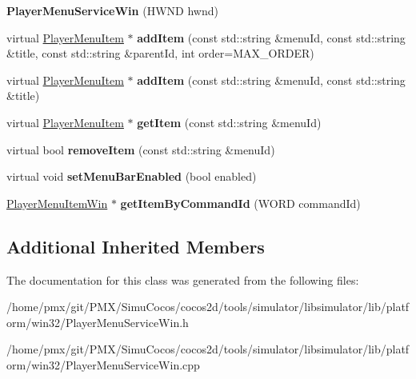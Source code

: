 \begin{DoxyCompactItemize}
{\bfseries Player\+Menu\+Service\+Win} (H\+W\+ND hwnd)
\item 
\mbox{\label{classPlayerMenuServiceWin_aabfcfea20278c36b7c9c483c688c1677}} 
virtual \hyperlink{classPlayerMenuItem}{Player\+Menu\+Item} $\ast$ {\bfseries add\+Item} (const std\+::string \&menu\+Id, const std\+::string \&title, const std\+::string \&parent\+Id, int order=M\+A\+X\+\_\+\+O\+R\+D\+ER)
\item 
\mbox{\label{classPlayerMenuServiceWin_a9c8ff07e00025d5bf4ee51d768a443d3}} 
virtual \hyperlink{classPlayerMenuItem}{Player\+Menu\+Item} $\ast$ {\bfseries add\+Item} (const std\+::string \&menu\+Id, const std\+::string \&title)
\item 
\mbox{\label{classPlayerMenuServiceWin_aa9096aef2d35b84e9774f11fa275e130}} 
virtual \hyperlink{classPlayerMenuItem}{Player\+Menu\+Item} $\ast$ {\bfseries get\+Item} (const std\+::string \&menu\+Id)
\item 
\mbox{\label{classPlayerMenuServiceWin_a80ea8fe18ea241f033449dd279ae6035}} 
virtual bool {\bfseries remove\+Item} (const std\+::string \&menu\+Id)
\item 
\mbox{\label{classPlayerMenuServiceWin_ad9a72063cccd1b527b9f1f59c0a75100}} 
virtual void {\bfseries set\+Menu\+Bar\+Enabled} (bool enabled)
\item 
\mbox{\label{classPlayerMenuServiceWin_a6428c3887971405807fcf52d84ee81b4}} 
\hyperlink{classPlayerMenuItemWin}{Player\+Menu\+Item\+Win} $\ast$ {\bfseries get\+Item\+By\+Command\+Id} (W\+O\+RD command\+Id)
\end{DoxyCompactItemize}
\subsection*{Additional Inherited Members}


The documentation for this class was generated from the following files\+:\begin{DoxyCompactItemize}
\item 
/home/pmx/git/\+P\+M\+X/\+Simu\+Cocos/cocos2d/tools/simulator/libsimulator/lib/platform/win32/Player\+Menu\+Service\+Win.\+h\item 
/home/pmx/git/\+P\+M\+X/\+Simu\+Cocos/cocos2d/tools/simulator/libsimulator/lib/platform/win32/Player\+Menu\+Service\+Win.\+cpp\end{DoxyCompactItemize}
